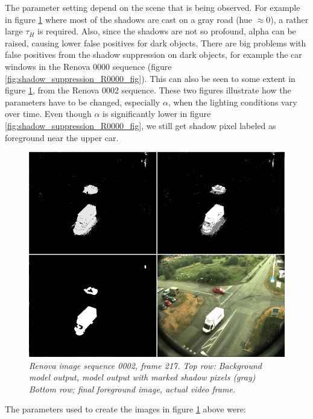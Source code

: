 The parameter setting depend on the scene that is being observed. For example in figure \ref{fig:shadow_suppression_R0002_fig} where most of the shadows are cast on a gray road (hue $\approx 0$), a rather large $\tau_H$ is required. Also, since the shadows are not so profound, alpha can be raised, causing lower false positives for dark objects. There are big problems with false positives from the shadow suppression on dark objects, for example the car windows in the Renova 0000 sequence (figure \ref{fig:shadow_suppression_R0000_fig}). This can also be seen to some extent in figure \ref{fig:shadow_suppression_R0002_fig}, from the Renova 0002 sequence. These two figures illustrate how the parameters have to be changed, especially $\alpha$, when the lighting conditions vary over time. Even though $\alpha$ is significantly lower in figure \ref{fig:shadow_suppression_R0000_fig}, we still get shadow pixel labeled as foreground near the upper car.

\newpage
\begin{figure}[htb]
	\centering
	\includegraphics[width=\linewidth]{images/ShadowRenova0002.png}
	\caption{\textit{Renova image sequence 0002, frame 217. 
	\newline
	Top row: Background model output, model output with marked shadow pixels (gray) \newline
	Bottom row; final foreground image, actual video frame.}}
	\label{fig:shadow_suppression_R0002_fig}  %
\end{figure}

The parameters used to create the images in figure \ref{fig:shadow_suppression_R0002_fig} above were:

